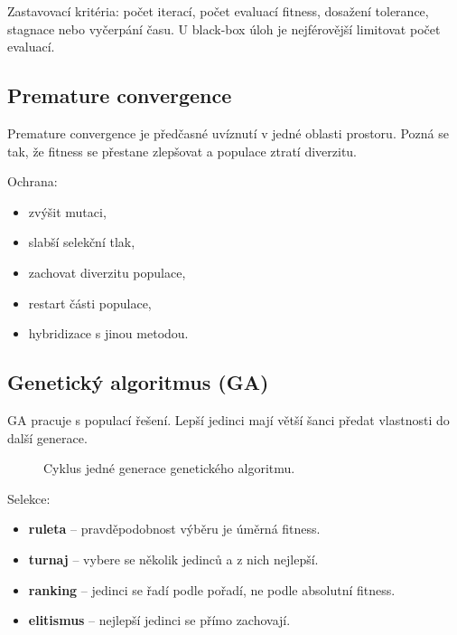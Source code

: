 Zastavovací kritéria: počet iterací, počet evaluací fitness, dosažení
tolerance, stagnace nebo vyčerpání času. U black-box úloh je nejférovější
limitovat počet evaluací.

\subsection*{Premature convergence}
Premature convergence je předčasné uvíznutí v jedné oblasti prostoru. Pozná se
tak, že fitness se přestane zlepšovat a populace ztratí diverzitu.

Ochrana:
\begin{itemize}
    \item zvýšit mutaci,
    \item slabší selekční tlak,
    \item zachovat diverzitu populace,
    \item restart části populace,
    \item hybridizace s jinou metodou.
\end{itemize}

\subsection*{Genetický algoritmus (GA)}
GA pracuje s populací řešení. Lepší jedinci mají větší šanci předat vlastnosti
do další generace.

\begin{figure}[H]
    \centering
    \caption{Cyklus jedné generace genetického algoritmu.}
\end{figure}

Selekce:
\begin{itemize}
    \item \textbf{ruleta} -- pravděpodobnost výběru je úměrná fitness.
    \item \textbf{turnaj} -- vybere se několik jedinců a z nich nejlepší.
    \item \textbf{ranking} -- jedinci se řadí podle pořadí, ne podle absolutní fitness.
    \item \textbf{elitismus} -- nejlepší jedinci se přímo zachovají.
\end{itemize}

